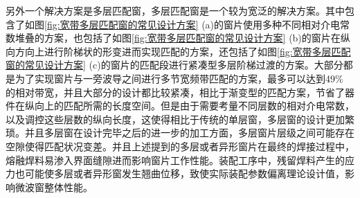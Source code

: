 \documentclass[master]{thesis-uestc}
\begin{document}
另外一个解决方案是多层匹配窗，多层匹配窗是一个较为宽泛的解决方案。其中包含了如图\ref{fig:宽带多层匹配窗的常见设计方案} (a)的窗片使用多种不同相对介电常数堆叠的方案，也包括了如图\ref{fig:宽带多层匹配窗的常见设计方案} (b)的窗片在纵向方向上进行阶梯状的形变进而实现匹配的方案，还包括了如图\ref{fig:宽带多层匹配窗的常见设计方案} (c)的窗片的匹配段进行紧凑型多层阶梯过渡的方案。大部分都是为了实现窗片与一旁波导之间进行多节宽频带匹配的方案，最多可以达到49\% 的相对带宽，并且大部分的设计都比较紧凑，相比于渐变型的匹配方案，节省了器件在纵向上的匹配所需的长度空间。但是由于需要考量不同层数的相对介电常数，以及调控这些层数的纵向长度，这使得相比于传统的单层窗，多层窗的设计更加繁琐。并且多层窗在设计完毕之后的进一步的加工方面，多层窗片层级之间可能存在空隙使得匹配状况变差。并且上述提到的多层或者异形窗片在最终的焊接过程中，熔融焊料易渗入界面缝隙进而影响窗片工作性能。装配工序中，残留焊料产生的应力也可能使多层或者异形窗发生翘曲位移，致使实际装配参数偏离理论设计值，影响微波窗整体性能。
\end{document}

